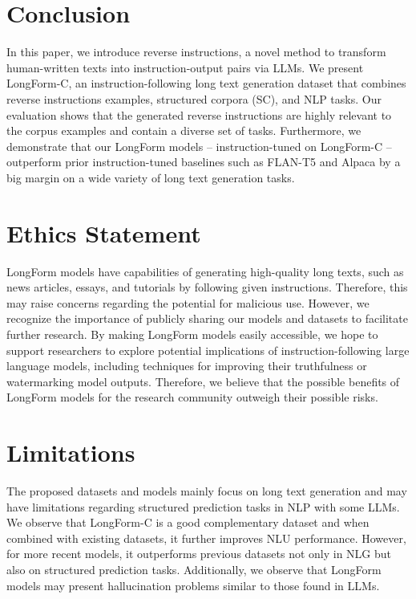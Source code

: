 	\section{Conclusion}
	In this paper, we introduce reverse instructions, a novel method to transform human-written texts into instruction-output pairs via LLMs. We present LongForm-C, an instruction-following long text generation dataset that combines reverse instructions examples, structured corpora (SC), and NLP tasks. Our evaluation shows that the generated reverse instructions are highly relevant to the corpus examples and contain a diverse set of tasks. Furthermore, we demonstrate that our LongForm models -- instruction-tuned on LongForm-C  -- outperform prior instruction-tuned baselines such as FLAN-T5 and Alpaca by a big margin on a wide variety of long text generation tasks.

	\section*{Ethics Statement} LongForm models have capabilities of generating high-quality long texts, such as news articles, essays, and tutorials by following given instructions. Therefore, this may raise concerns regarding the potential for malicious use. However, we recognize the importance of publicly sharing our models and datasets to facilitate further research. By making LongForm models easily accessible, we hope to support researchers to explore potential implications of instruction-following large language models, including techniques for improving their truthfulness or watermarking model outputs. Therefore, we believe that the possible benefits of LongForm models for the research community outweigh their possible risks.

	\section*{Limitations}
	The proposed datasets and models mainly focus on long text generation and may have limitations regarding structured prediction tasks in NLP with some LLMs. We observe that LongForm-C is a good complementary dataset and when combined with existing datasets, it further improves NLU performance. However, for more recent models, it outperforms previous datasets not only in NLG but also on structured prediction tasks. Additionally, we observe that LongForm models may present hallucination problems similar to those found in LLMs.	



